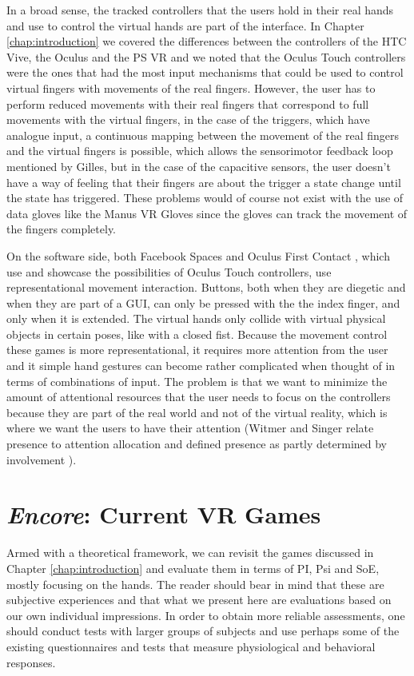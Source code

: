 In a broad sense, the tracked controllers that the users hold in their real hands and use to control the virtual hands are part of the interface. In Chapter \ref{chap:introduction} we covered the differences between the controllers of the HTC Vive, the Oculus and the PS VR and we noted that the Oculus Touch controllers were the ones that had the most input mechanisms that could be used to control virtual fingers with movements of the real fingers. However, the user has to perform reduced movements with their real fingers that correspond to full movements with the virtual fingers, in the case of the triggers, which have analogue input, a continuous mapping between the movement of the real fingers and the virtual fingers is possible, which allows the sensorimotor feedback loop mentioned by Gilles, but in the case of the capacitive sensors, the user doesn't have a way of feeling that their fingers are about the trigger a state change until the state has triggered. These problems would of course not exist with the use of data gloves like the Manus VR Gloves since the gloves can track the movement of the fingers completely.

On the software side, both Facebook Spaces \parencite{facebookSpaces} and Oculus First Contact \parencite{firstContact}, which use and showcase the possibilities of Oculus Touch controllers, use representational movement interaction. Buttons, both when they are diegetic and when they are part of a GUI, can only be pressed with the the index finger, and only when it is extended. The virtual hands only collide with virtual physical objects in certain poses, like with a closed fist. Because the movement control these games is more representational, it requires more attention from the user and it simple hand gestures can become rather complicated when thought of in terms of combinations of input. The problem is that we want to minimize the amount of attentional resources that the user needs to focus on the controllers because they are part of the real world and not of the virtual reality, which is where we want the users to have their attention (Witmer and Singer relate presence to attention allocation and defined presence as partly determined by involvement \parencite{Schuemie2001}).

\section{\textit{Encore}: Current VR Games}
\label{sec:soaRevisited}

Armed with a theoretical framework, we can revisit the games discussed in Chapter \ref{chap:introduction} and evaluate them in terms of PI, Psi and SoE, mostly focusing on the hands. The reader should bear in mind that these are subjective experiences and that what we present here are evaluations based on our own individual impressions. In order to obtain more reliable assessments, one should conduct tests with larger groups of subjects and use perhaps some of the existing questionnaires and tests that measure physiological and behavioral responses.

